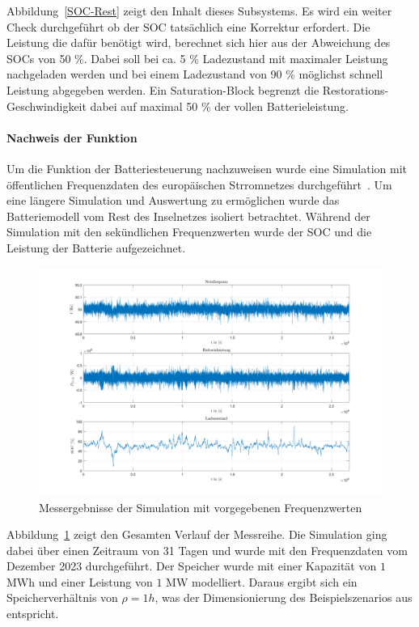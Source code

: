 Abbildung~\ref{SOC-Rest} zeigt den Inhalt dieses Subsystems.
Es wird ein weiter Check durchgeführt ob der SOC tatsächlich eine Korrektur erfordert.
Die Leistung die dafür benötigt wird, berechnet sich hier aus der Abweichung des SOCs von 50 \%.
Dabei soll bei ca. 5 \% Ladezustand mit maximaler Leistung nachgeladen werden und bei einem Ladezustand von
90 \% möglichst schnell Leistung abgegeben werden.
Ein Saturation-Block begrenzt die Restorations-Geschwindigkeit dabei auf maximal 50 \% der vollen Batterieleistung.

\paragraph{Nachweis der Funktion}
Um die Funktion der Batteriesteuerung nachzuweisen wurde eine Simulation mit öffentlichen Frequenzdaten des europäischen Strromnetzes durchgeführt~\parencite[]{noauthor_netztransparenz_nodate}.
Um eine längere Simulation und Auswertung zu ermöglichen wurde das Batteriemodell vom Rest des Inselnetzes isoliert betrachtet.
Während der Simulation mit den sekündlichen Frequenzwerten wurde der SOC und die Leistung der Batterie aufgezeichnet.

\begin{figure}[h!]
	\centering
	\includegraphics[width=14cm]{Abbildungen/SteuerungFCR.png}
	\caption{Messergebnisse der Simulation mit vorgegebenen Frequenzwerten}\label{FCRMessung}
\end{figure}

Abbildung~\ref{FCRMessung} zeigt den Gesamten Verlauf der Messreihe.
Die Simulation ging dabei über einen Zeitraum von 31 Tagen und wurde mit den Frequenzdaten vom Dezember 2023 durchgeführt.
Der Speicher wurde mit einer Kapazität von $1$ MWh und einer Leistung von $1$ MW modelliert.
Daraus ergibt sich ein Speicherverhältnis von $\rho = 1h$, was der Dimensionierung des Beispielszenarios aus\parencite[S. 7]{Reservebetrieb}
entspricht.

